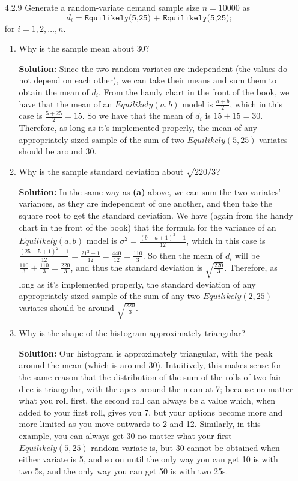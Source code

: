 \documentclass[11pt]{article} %
\begin{document}
\begin{enumerate}
\item[4.2.9] Generate a random-variate demand sample size $n = 10000$ as $$d_i = \texttt{Equilikely(5,25) + Equilikely(5,25);}$$  for $i = 1, 2, \dots, n$.

\begin{enumerate}

\item Why is the sample mean about 30?

{\bf Solution:} Since the two random variates are independent (the values do not depend on each other), we can take their means and sum them to obtain the mean of $d_i$.  From the handy chart in the front of the book, we have that the mean of an $Equilikely(a,b)$ model is $\frac{a+b}{2}$, which in this case is $\frac{5+25}{2} = 15$.  So we have that the mean of $d_i$ is $15 + 15 = 30$.  Therefore, as long as it's implemented properly, the mean of any appropriately-sized sample of the sum of two $Equilikely(5,25)$ variates should be around 30.

\item Why is the sample standard deviation about $\sqrt{220/3}$?

{\bf Solution:} In the same way as {\bf(a)} above, we can sum the two variates' variances, as they are independent of one another, and then take the square root to get the standard deviation.  We have (again from the handy chart in the front of the book) that the formula for the variance of an $Equilikely(a,b)$ model is $\sigma^2 = \frac{(b-a+1)^2 - 1}{12}$, which in this case is $\frac{(25 - 5 + 1)^2-1}{12} = \frac{21^2-1}{12} = \frac{440}{12} = \frac{110}{3}$.  So then the mean of $d_i$ will be $\frac{110}{3} + \frac{110}{3} = \frac{220}{3}$, and thus the standard deviation is $\sqrt{\frac{220}{3}}$.  Therefore, as long as it's implemented properly, the standard deviation of any appropriately-sized sample of the sum of any two $Equilikely(2,25)$ variates should be around $\sqrt{\frac{220}{3}}$.

\item Why is the shape of the histogram approximately triangular?

{\bf Solution:} Our histogram is approximately triangular, with the peak around the mean (which is around 30).  Intuitively, this makes sense for the same reason that the distribution of the sum of the rolls of two fair dice is triangular, with the apex around the mean at 7; because no matter what you roll first, the second roll can always be a value which, when added to your first roll, gives you 7, but your options become more and more limited as you move outwards to 2 and 12.  Similarly, in this example, you can always get 30 no matter what your first $Equilikely(5,25)$ random variate is, but 30 cannot be obtained when either variate is 5, and so on until the only way you can get 10 is with two 5s, and the only way you can get 50 is with two 25s.
\end{enumerate}


\end{enumerate}
\end{document}

